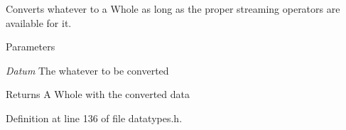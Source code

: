 Converts whatever to a Whole as long as the proper streaming operators are available for it. 


\begin{DoxyParams}{Parameters}
\item[{\em Datum}]The whatever to be converted \end{DoxyParams}
\begin{DoxyReturn}{Returns}
A Whole with the converted data 
\end{DoxyReturn}


Definition at line 136 of file datatypes.h.

